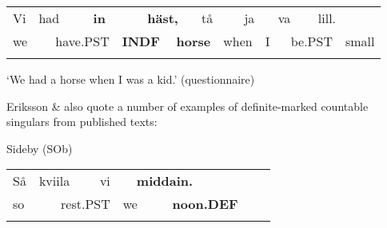 \begin{tabular}{llllllllllllllll}
\lsptoprule
Vi & \multicolumn{2}{l}{had

} & \multicolumn{2}{l}{{\bfseries in}

} & \multicolumn{2}{l}{{\bfseries häst,}

} & \multicolumn{2}{l}{tå

} & \multicolumn{2}{l}{ja

} & \multicolumn{2}{l}{va

} & \multicolumn{2}{l}{lill.

} & \\
\multicolumn{2}{l}{we

} & \multicolumn{2}{l}{have.PST

} & \multicolumn{2}{l}{{\bfseries INDF}

} & \multicolumn{2}{l}{{\bfseries horse}

} & \multicolumn{2}{l}{when

} & \multicolumn{2}{l}{I

} & \multicolumn{2}{l}{be.PST

} & \multicolumn{2}{l}{small

}\\
\lspbottomrule
\end{tabular}

\begin{styleTranslation}
‘We had a horse when I was a kid.’ (questionnaire)

\end{styleTranslation}

\begin{styleBodytextC}
Eriksson \& \citet{Rendahl1999} also quote a number of examples of definite-marked countable singulars from published texts:

\end{styleBodytextC}


\begin{listWWNumileveli}
\item {}

\begin{styleExample}
Sideby (SOb)

\end{styleExample}

\end{listWWNumileveli}

\begin{tabular}{llllllllll}
\lsptoprule
Så & \multicolumn{2}{l}{kviila

} & \multicolumn{2}{l}{vi

} & \multicolumn{2}{l}{{\bfseries middain.}

} & \multicolumn{2}{l}{} & \\
\multicolumn{2}{l}{so

} & \multicolumn{2}{l}{rest.PST

} & \multicolumn{2}{l}{we

} & \multicolumn{2}{l}{{\bfseries noon.DEF}

} & \multicolumn{2}{l}{}\\
\lspbottomrule
\end{tabular}

